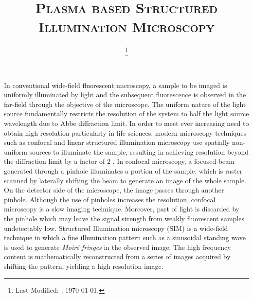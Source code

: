 \documentclass[11pt]{article}
\begin{document}
\title{\textsc{Plasma based Structured Illumination Microscopy}}
\date{\footnote{Last Modified: \currenttime, \today.}}
\maketitle

In conventional wide-field fluorescent microscopy, a sample to be imaged is uniformly illuminated by light and the subsequent fluorescence is observed in the far-field through the objective of the microscope. The uniform nature of the light source fundamentally restricts the resolution of the system to half the light source wavelength due to Abbe diffraction limit. In order to meet ever increasing need to obtain high resolution particularly in life sciences, modern microscopy techniques such as confocal and linear structured illumination microscopy use spatially non-uniform sources to illuminate the sample, resulting in achieving resolution beyond the diffraction limit by a factor of $2$ \cite{Minsky_1988,Gustafsson_2005}. In confocal microscopy, a focused beam generated through a pinhole illuminates a portion of the sample. which is raster scanned by laterally shifting the beam to generate an image of the whole sample. On the detector side of the microscope, the image passes through another pinhole. Although the use of pinholes increases the resolution, confocal microscopy is a slow imaging technique. Moreover, part of light is discarded by the pinhole which may leave the signal strength from weakly fluorescent samples undetectably low. Structured Illumination microscopy (SIM) is a wide-field technique in which a fine illumination pattern such as a sinusoidal standing wave is used to generate \emph{Moiré fringes} in the observed image. The high frequency content is mathematically reconstructed from a series of images acquired by shifting the pattern, yielding a high resolution image.
\end{document}
